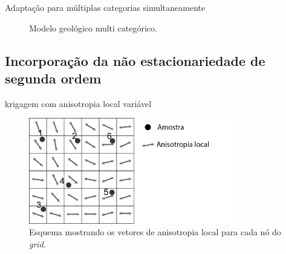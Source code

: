 \documentclass[aspectratio=169]{beamer}
\begin{document}
\begin{frame}{Adaptação para múltiplas categorias simultaneamente}
\begin{figure}[H]
	\caption{Modelo geológico multi categórico.} 
	\label{multi_cat_rbf}
	\centering
{}
\end{figure}

\end{frame}

\subsection{Incorporação da não estacionariedade de segunda ordem}

\begin{frame}{krigagem com anisotropia local variável}

\begin{figure}[H]
	\caption{\label{lva_krig_cartoon}Esquema mostrando os vetores de anisotropia local para cada nó do \textit{grid}.}
	\begin{center}
		\includegraphics[width=0.8\textwidth]{capitulo_2/lvakrig1.jpg}
	\end{center}
\end{figure}
	
\end{frame}
\end{document}
